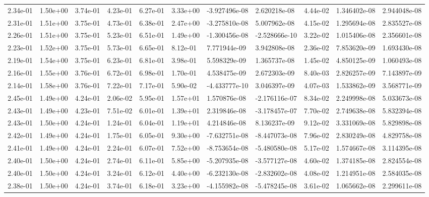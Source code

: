 \begin{longtable}{| p{} | p{} |}
2.34e-01 & 1.50e+00 & 3.74e-01 & 4.23e-01 & 6.27e-01 & 3.33e+00 & -3.927496e-08 &  2.620218e-08 &  4.44e-02 &  1.346402e-08 &  2.944048e-08 \\
2.31e-01 & 1.51e+00 & 3.75e-01 & 4.73e-01 & 6.38e-01 & 2.47e+00 & -3.275810e-08 &  5.007962e-08 &  4.15e-02 &  1.295694e-08 &  2.835527e-08 \\
2.26e-01 & 1.51e+00 & 3.75e-01 & 5.23e-01 & 6.51e-01 & 1.49e+00 & -1.300456e-08 & -2.528666e-10 &  3.22e-02 &  1.015406e-08 &  2.356601e-08 \\
2.23e-01 & 1.52e+00 & 3.75e-01 & 5.73e-01 & 6.65e-01 & 8.12e-01 &  7.771944e-09 &  3.942808e-08 &  2.36e-02 &  7.853620e-09 &  1.693430e-08 \\
2.19e-01 & 1.54e+00 & 3.75e-01 & 6.23e-01 & 6.81e-01 & 3.98e-01 &  5.598329e-09 &  1.365737e-08 &  1.45e-02 &  4.850125e-09 &  1.060493e-08 \\
2.16e-01 & 1.55e+00 & 3.76e-01 & 6.72e-01 & 6.98e-01 & 1.70e-01 &  4.538475e-09 &  2.672303e-09 &  8.40e-03 &  2.826257e-09 &  7.143897e-09 \\
2.14e-01 & 1.58e+00 & 3.76e-01 & 7.22e-01 & 7.17e-01 & 5.90e-02 & -4.433777e-10 &  3.046397e-09 &  4.07e-03 &  1.533862e-09 &  3.568771e-09 \\
2.45e-01 & 1.49e+00 & 4.24e-01 & 2.06e-02 & 5.95e-01 & 1.57e+01 &  1.570876e-08 & -2.176116e-07 &  8.34e-02 &  2.249998e-08 &  5.033673e-08 \\
2.43e-01 & 1.49e+00 & 4.23e-01 & 7.51e-02 & 6.01e-01 & 1.39e+01 &  2.319846e-08 & -3.178457e-07 &  7.70e-02 &  2.749638e-08 &  5.832394e-08 \\
2.43e-01 & 1.50e+00 & 4.24e-01 & 1.24e-01 & 6.04e-01 & 1.19e+01 &  4.214846e-08 &  8.136237e-09 &  9.12e-02 &  3.331069e-08 &  5.829898e-08 \\
2.42e-01 & 1.49e+00 & 4.24e-01 & 1.75e-01 & 6.05e-01 & 9.30e+00 & -7.632751e-08 & -8.447073e-08 &  7.96e-02 &  2.830249e-08 &  4.829758e-08 \\
2.41e-01 & 1.49e+00 & 4.24e-01 & 2.24e-01 & 6.07e-01 & 7.52e+00 & -8.753654e-08 & -5.480580e-08 &  5.17e-02 &  1.574667e-08 &  3.114395e-08 \\
2.40e-01 & 1.50e+00 & 4.24e-01 & 2.74e-01 & 6.11e-01 & 5.85e+00 & -5.207935e-08 & -3.577127e-08 &  4.60e-02 &  1.374185e-08 &  2.824554e-08 \\
2.40e-01 & 1.50e+00 & 4.24e-01 & 3.24e-01 & 6.12e-01 & 4.40e+00 & -6.232130e-08 & -2.832602e-08 &  4.08e-02 &  1.214951e-08 &  2.584035e-08 \\
2.38e-01 & 1.50e+00 & 4.24e-01 & 3.74e-01 & 6.18e-01 & 3.23e+00 & -4.155982e-08 & -5.478245e-08 &  3.61e-02 &  1.065662e-08 &  2.299611e-08 \\

\end{longtable}
